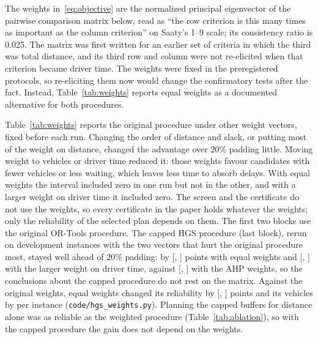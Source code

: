 \documentclass[11pt,a4paper]{article}
\theoremstyle{remark}
\begin{document}
The weights in~\eqref{eq:objective} are the normalized principal eigenvector of the
pairwise comparison matrix below, read as ``the row criterion is this many times as
important as the column criterion'' on Saaty's 1--9 scale; its consistency ratio is
0.025. The matrix was first written for an earlier set of criteria in which the third
was total distance, and its third row and column were not re-elicited when that
criterion became driver time. The weights were fixed in the preregistered protocols, so
re-eliciting them now would change the confirmatory tests after the fact. Instead,
Table~\ref{tab:weights} reports equal weights as a documented alternative for both
procedures.

\begin{center}
\small

\end{center}

Table~\ref{tab:weights} reports the original procedure under other weight vectors,
fixed before each run. Changing the order of distance and slack, or putting most of
the weight on distance, changed the advantage over 20\% padding little. Moving
weight to vehicles or driver time reduced it: those weights favour candidates with
fewer vehicles or less waiting, which leaves less time to absorb delays. With equal
weights the interval included zero in one run but not in the other, and with a
larger weight on driver time it included zero. The screen and
the certificate do not use the weights, so every certificate in the paper holds
whatever the weights; only the reliability of the selected plan depends on them.
The first two blocks use the original OR-Tools procedure. The capped HGS procedure
(last block), rerun on \HwEqN{} development instances with the two vectors that hurt
the original procedure most, stayed well ahead of 20\% padding: by \HwEqPad{}
[\HwEqPadLo, \HwEqPadHi] points with equal weights and \HwDurPad{} [\HwDurPadLo,
\HwDurPadHi] with the larger weight on driver time, against \HwEqOrigPad{}
[\HwEqOrigPadLo, \HwEqOrigPadHi] with the AHP weights, so the conclusions about the
capped procedure do not rest on the matrix. Against the original weights, equal weights changed its reliability by \HwEqOrig{}
[\HwEqOrigLo, \HwEqOrigHi] points and its vehicles by \HwEqFleet{} per instance
(\texttt{code/hgs\_weights.py}). Planning
the capped buffers for distance alone was as reliable as the weighted procedure
(Table~\ref{tab:ablation}), so with the capped procedure the gain does not depend on
the weights.


\end{document}
